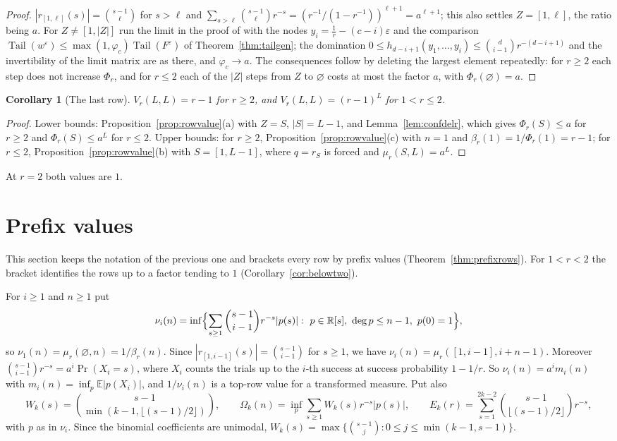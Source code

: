 \documentclass[11pt]{article}
\newtheorem{corollary}[theorem]{Corollary}
\newcommand{\R}{\mathbb R}
\DeclareMathOperator{\Tail}{Tail}
\begin{document}
\begin{proof}
$|r_{[1,\ell]}(s)|=\binom{s-1}\ell$ for $s>\ell$ and
$\sum_{s>\ell}\binom{s-1}\ell r^{-s}=(r^{-1}/(1-r^{-1}))^{\ell+1}=a^{\ell+1}$;
this also settles $Z=[1,\ell]$, the ratio being $a$.  For
$Z\ne[1,|Z|]$ run the limit in the proof of \cite[Lemma~4.6]{coefficient-mass} with
the nodes $y_i=\frac1r-(c-i)\varepsilon$ and the comparison
$\Tail(w^\varepsilon)\le\max(1,\varphi_c)\Tail(F^\varepsilon)$ of
Theorem~\ref{thm:tailgen}; the domination
$0\le h_{d-i+1}(y_1,\ldots,y_i)\le\binom d{i-1}r^{-(d-i+1)}$ and the
invertibility of the limit matrix are as there, and $\varphi_c\to a$.  The
consequences follow by deleting the largest element repeatedly: for $r\ge2$
each step does not increase $\Phi_r$, and for $r\le2$ each of the $|Z|$
steps from $Z$ to $\varnothing$ costs at most the factor $a$, with
$\Phi_r(\varnothing)=a$.
\end{proof}

\begin{corollary}[The last row]\label{cor:lastrowr}
$V_r(L,L)=r-1$ for $r\ge2$, and $V_r(L,L)=(r-1)^L$ for $1<r\le2$.
\end{corollary}

\begin{proof}
Lower bounds: Proposition~\ref{prop:rowvalue}(a) with $Z=S$, $|S|=L-1$, and
Lemma~\ref{lem:confdelr}, which gives $\Phi_r(S)\le a$ for $r\ge2$ and
$\Phi_r(S)\le a^L$ for $r\le2$.  Upper bounds: for $r\ge2$,
Proposition~\ref{prop:rowvalue}(c) with $n=1$ and
$\beta_r(1)=1/\Phi_r(1)=r-1$; for $r\le2$, Proposition~\ref{prop:rowvalue}(b)
with $S=[1,L-1]$, where $q=r_S$ is forced and $\mu_r(S,L)=a^L$.
\end{proof}

At $r=2$ both values are $1$.

\section{Prefix values}\label{sec:prefix}

This section keeps the notation of the previous one and brackets every row
by prefix values (Theorem~\ref{thm:prefixrows}).  For $1<r<2$ the bracket
identifies the rows up to a factor tending to $1$
(Corollary~\ref{cor:belowtwo}).

For $i\ge1$ and $n\ge1$ put
\[
  \nu_i(n)=\inf\Bigl\{\sum_{s\ge1}\binom{s-1}{i-1}r^{-s}|p(s)|:\
  p\in\R[s],\ \deg p\le n-1,\ p(0)=1\Bigr\},
\]
so $\nu_1(n)=\mu_r(\varnothing,n)=1/\beta_r(n)$.  Since
$|r_{[1,i-1]}(s)|=\binom{s-1}{i-1}$ for $s\ge1$, we have
$\nu_i(n)=\mu_r([1,i-1],i+n-1)$.  Moreover
$\binom{s-1}{i-1}r^{-s}=a^i\Pr(X_i=s)$, where $X_i$ counts the trials up to
the $i$-th success at success probability $1-1/r$.  So
$\nu_i(n)=a^im_i(n)$ with $m_i(n)=\inf_p\mathbb E|p(X_i)|$, and
$1/\nu_i(n)$ is a top-row value for a transformed measure.  Put also
\[
  W_k(s)=\binom{s-1}{\min(k-1,\lfloor(s-1)/2\rfloor)},\qquad
  \Omega_k(n)=\inf_p\sum_{s\ge1}W_k(s)r^{-s}|p(s)|,\qquad
  E_k(r)=\sum_{s=1}^{2k-2}\binom{s-1}{\lfloor(s-1)/2\rfloor}r^{-s},
\]
with $p$ as in $\nu_i$.  Since the binomial coefficients are unimodal,
$W_k(s)=\max\{\binom{s-1}j:0\le j\le\min(k-1,s-1)\}$.
\end{document}
